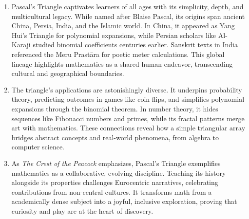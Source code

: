 \documentclass{article}
\begin{document}
\begin{enumerate}
    \item Pascal’s Triangle captivates learners of all ages with its simplicity, depth, and multicultural legacy. While named after Blaise Pascal, its origins span ancient China, Persia, India, and the Islamic world. In China, it appeared as Yang Hui’s Triangle for polynomial expansions, while Persian scholars like Al-Karaji studied binomial coefficients centuries earlier. Sanskrit texts in India referenced the Meru Prastāra for poetic meter calculations. This global lineage highlights mathematics as a shared human endeavor, transcending cultural and geographical boundaries. \cite{joseph1991crest}
    \item The triangle’s applications are astonishingly diverse. It underpins probability theory, predicting outcomes in games like coin flips, and simplifies polynomial expansions through the binomial theorem. In number theory, it hides sequences like Fibonacci numbers and primes, while its fractal patterns merge art with mathematics. These connections reveal how a simple triangular array bridges abstract concepts and real-world phenomena, from algebra to computer science.
    \item As \textit{The Crest of the Peacock} emphasizes, Pascal’s Triangle exemplifies mathematics as a collaborative, evolving discipline.\cite{joseph1991crest} Teaching its history alongside its properties challenges Eurocentric narratives, celebrating contributions from non-central cultures. It transforms math from a academically dense subject into a joyful, inclusive exploration, proving that curiosity and play are at the heart of discovery.
\end{enumerate}
\newpage

\end{document}
